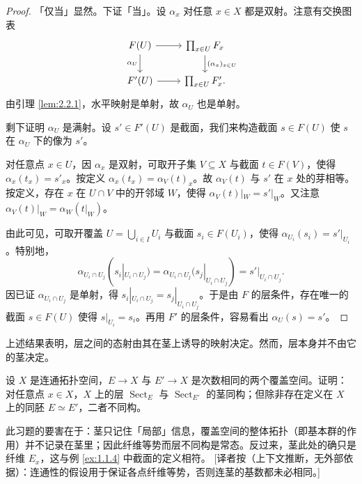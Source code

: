 \begin{proof}
「仅当」显然。下证「当」。设 $\alpha_x$ 对任意 $x\in X$ 都是双射。注意有交换图表
\[
\begin{tikzcd}
F(U) \arrow[r] \arrow[d,"\alpha_U"'] & \prod_{x\in U}F_x \arrow[d,"(\alpha_x)_{x\in U}"] \\
F'(U) \arrow[r] & \prod_{x\in U}F'_x.
\end{tikzcd}
\]
由引理 \ref{lem:2.2.1}，水平映射是单射，故 $\alpha_U$ 也是单射。

剩下证明 $\alpha_U$ 是满射。设 $s'\in F'(U)$ 是截面，我们来构造截面 $s\in F(U)$ 使 $s$ 在 $\alpha_U$ 下的像为 $s'$。

对任意点 $x\in U$，因 $\alpha_x$ 是双射，可取开子集 $V\subseteq X$ 与截面 $t\in F(V)$，使得 $\alpha_x(t_x)=s'_x$。按定义 $\alpha_x(t_x)=\alpha_V(t)_x$。故 $\alpha_V(t)$ 与 $s'$ 在 $x$ 处的芽相等。按定义，存在 $x$ 在 $U\cap V$ 中的开邻域 $W$，使得 $\alpha_V(t)|_W=s'|_W$。又注意 $\alpha_V(t)|_W=\alpha_W(t|_W)$。

由此可见，可取开覆盖 $U=\bigcup_{i\in I}U_i$ 与截面 $s_i\in F(U_i)$，使得 $\alpha_{U_i}(s_i)=s'|_{U_i}$。特别地，
\[
\alpha_{U_i\cap U_j}(s_i|_{U_i\cap U_j})=\alpha_{U_i\cap U_j}(s_j|_{U_i\cap U_j})=s'|_{U_i\cap U_j}.
\]
因已证 $\alpha_{U_i\cap U_j}$ 是单射，得 $s_i|_{U_i\cap U_j}=s_j|_{U_i\cap U_j}$。于是由 $F$ 的层条件，存在唯一的截面 $s\in F(U)$ 使得 $s|_{U_i}=s_i$。再用 $F'$ 的层条件，容易看出 $\alpha_U(s)=s'$。
\end{proof}

上述结果表明，层之间的态射由其在茎上诱导的映射决定。然而，层本身并不由它的茎决定。

\begin{exercise}\label{exc:2.2.6}
设 $X$ 是连通拓扑空间，$E\to X$ 与 $E'\to X$ 是次数相同的两个覆盖空间。证明：对任意点 $x\in X$，$X$ 上的层 $\operatorname{Sect}_E$ 与 $\operatorname{Sect}_{E'}$ 的茎同构；但除非存在定义在 $X$ 上的同胚 $E\simeq E'$，二者不同构。
\end{exercise}

\begin{yizhu}
此习题的要害在于：茎只记住「局部」信息，覆盖空间的整体拓扑（即基本群的作用）并不记录在茎里；因此纤维等势而层不同构是常态。反过来，茎此处的确只是纤维 $E_x$，这与例 \ref{ex:1.1.4} 中截面的定义相符。
[译者按（上下文推断，无外部依据）：连通性的假设用于保证各点纤维等势，否则连茎的基数都未必相同。]
\end{yizhu}

